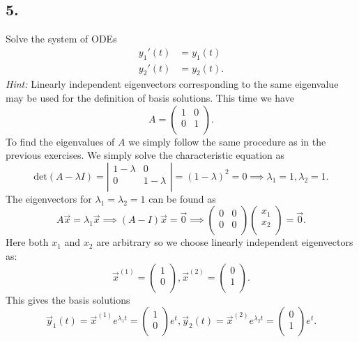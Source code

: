 \subsection*{5.} Solve the system of ODEs
\begin{align*}
  y_1'(t) &= y_1 (t) \\
  y_2'(t) &= y_2(t) 
.\end{align*}
\textit{Hint:} Linearly independent eigenvectors corresponding to the same eigenvalue may be used for the definition of basis solutions.
\bigbreak
This time we have
\[ 
A = \begin{pmatrix}
1 & 0\\
0 & 1\\
\end{pmatrix}
.\]
To find the eigenvalues of $A$ we simply follow the same procedure as in the previous exercises. We simply solve the characteristic equation as
\[ 
\mathrm{det}(A - \lambda I) = \left| \begin{array}{cc}
1-\lambda & 0\\
0 & 1-\lambda\\
\end{array} \right| = (1-\lambda)^2 = 0 \implies \lambda_1 = 1, \lambda_2 = 1
.\]
The eigenvectors for $\lambda_1 = \lambda_2 = 1$ can be found as
\[ 
A \Vec{x} = \lambda_1 \Vec{x} \implies (A-I) \Vec{x} = \Vec{0} \implies \begin{pmatrix}
0 & 0\\
0 & 0\\
\end{pmatrix} \begin{pmatrix}
x_1\\
x_2\\
\end{pmatrix}= \Vec{0}
.\]
Here both $x_1$ and $x_2$ are arbitrary so we choose linearly independent eigenvectors as:
\[ 
\Vec{x}^{(1)} = \begin{pmatrix}
1\\
0\\
\end{pmatrix}, \Vec{x}^{(2)} = \begin{pmatrix}
0\\
1\\
\end{pmatrix}
.\]
This gives the basis solutions
\[ 
  \Vec{y}_1(t) = \Vec{x}^{(1)} e^{\lambda_1 t} = \begin{pmatrix}
  1\\
  0\\
  \end{pmatrix} e^{t}, \Vec{y}_2(t) = \Vec{x}^{(2)} e^{\lambda_2 t} = \begin{pmatrix}
  0\\
  1\\
  \end{pmatrix} e^{t}
.\]
